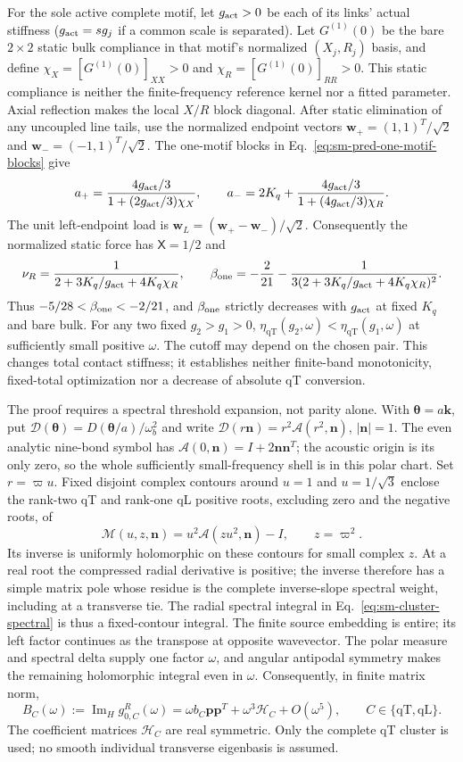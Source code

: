 \documentclass[10pt,aps,onecolumn,notitlepage,nofootinbib]{revtex4-2}
\newcommand{\vk}{\bm k}
\newcommand{\qT}{\mathrm{qT}}
\newcommand{\qL}{\mathrm{qL}}
\newcommand{\ImH}{\operatorname{Im}_{\!H}}
\begin{document}
For the sole active complete motif, let $g_{\rm act}>0$ be each of its
links' actual stiffness ($g_{\rm act}=s g_j$ if a common scale is separated).
Let $G^{(1)}(0)$ be the bare $2\times2$ static bulk compliance in that
motif's normalized $(X_j,R_j)$ basis, and define
$\chi_X=[G^{(1)}(0)]_{XX}>0$ and
$\chi_R=[G^{(1)}(0)]_{RR}>0$.
This static compliance is neither the finite-frequency reference kernel
nor a fitted parameter. Axial reflection makes the local $X/R$ block diagonal.
After static elimination of any uncoupled line tails, use the normalized
endpoint vectors $\bm w_+=(1,1)^T/\sqrt2$ and
$\bm w_-=(-1,1)^T/\sqrt2$.
The one-motif blocks in Eq.~\eqref{eq:sm-pred-one-motif-blocks} give
\[
 a_+=\frac{4g_{\rm act}/3}{1+(2g_{\rm act}/3)\chi_X},\qquad
 a_-=2K_q+\frac{4g_{\rm act}/3}{1+(4g_{\rm act}/3)\chi_R}.
\]
The unit left-endpoint load is
$\bm w_L=(\bm w_+-\bm w_-)/\sqrt2$.
Consequently the normalized static force has $\mathsf X=1/2$ and
\[
 \nu_R=\frac1{2+3K_q/g_{\rm act}+4K_q\chi_R},\qquad
 \beta_{\rm one}=-\frac2{21}
 -\frac1{3(2+3K_q/g_{\rm act}+4K_q\chi_R)^2}.
\]
Thus $-5/28<\beta_{\rm one}<-2/21$, and $\beta_{\rm one}$ strictly
decreases with $g_{\rm act}$ at fixed $K_q$ and bare bulk.
For any two fixed $g_2>g_1>0$,
$\eta_{\qT}(g_2,\omega)<\eta_{\qT}(g_1,\omega)$ at sufficiently
small positive $\omega$.
The cutoff may depend on the chosen pair. This changes total contact
stiffness; it establishes neither finite-band monotonicity, fixed-total
optimization nor a decrease of absolute qT conversion.

The proof requires a spectral threshold expansion, not parity alone.
With $\bm\theta=a\vk$, put
$\mathcal D(\bm\theta)=D(\bm\theta/a)/\omega_b^2$ and write
$\mathcal D(r\bm n)=r^2\mathcal A(r^2,\bm n)$, $|\bm n|=1$.
The even analytic nine-bond symbol has
$\mathcal A(0,\bm n)=I+2\bm n\bm n^T$; the acoustic origin is its
only zero, so the whole sufficiently small-frequency shell is in this
polar chart. Set $r=\varpi u$. Fixed disjoint complex contours around
$u=1$ and $u=1/\sqrt3$ enclose the rank-two qT and rank-one qL positive roots, excluding zero and the
negative roots, of
\[
 \mathcal M(u,z,\bm n)=u^2\mathcal A(zu^2,\bm n)-I,
 \qquad z=\varpi^2.
\]
Its inverse is uniformly holomorphic on these contours for small complex
$z$. At a real root the compressed radial derivative is positive;
the inverse therefore has a simple matrix pole whose residue is the
complete inverse-slope spectral weight, including at a transverse tie.
The radial spectral integral in Eq.~\eqref{eq:sm-cluster-spectral} is
thus a fixed-contour integral. The finite source embedding is entire;
its left factor continues as the transpose at opposite wavevector.
The polar measure and spectral delta supply one factor $\omega$,
and angular antipodal symmetry makes the remaining holomorphic integral
even in $\omega$. Consequently, in finite matrix norm,
\[
 B_C(\omega):=\ImH g_{0,C}^R(\omega)
 =\omega b_C\bm p\bm p^T+\omega^3\mathcal H_C+O(\omega^5),
 \qquad C\in\{\qT,\qL\}.
\]
The coefficient matrices $\mathcal H_C$ are real symmetric.
Only the complete qT cluster is used; no smooth individual transverse
eigenbasis is assumed.
\end{document}
